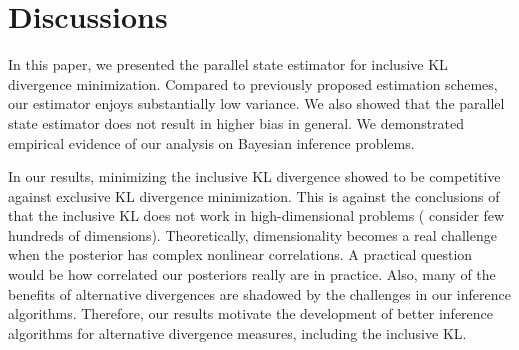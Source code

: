 
\vspace{-0.15in}
\section{Discussions}\label{section:discussion}
\vspace{-0.1in}
In this paper, we presented the parallel state estimator for inclusive KL divergence minimization.
Compared to previously proposed estimation schemes, our estimator enjoys substantially low variance.
We also showed that the parallel state estimator does not result in higher bias in general.
We demonstrated empirical evidence of our analysis on Bayesian inference problems.

In our results, minimizing the inclusive KL divergence showed to be competitive against exclusive KL divergence minimization.
This is against the conclusions of~\citet{dhaka_challenges_2021} that the inclusive KL does not work in high-dimensional problems (\citeauthor{dhaka_challenges_2021} consider few hundreds of dimensions).
Theoretically, dimensionality becomes a real challenge when the posterior has complex nonlinear correlations.
A practical question would be how correlated our posteriors really are in practice.
Also, many of the benefits of alternative divergences are shadowed by the challenges in our inference algorithms.
Therefore, our results motivate the development of better inference algorithms for alternative divergence measures, including the inclusive KL. 


